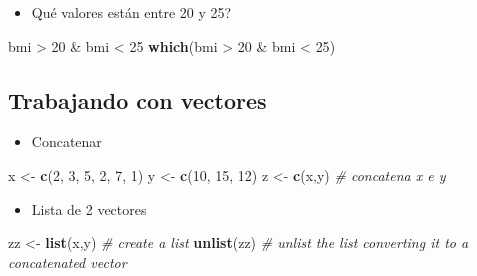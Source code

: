 \documentclass[]{article}
\def\tightlist{}
\newenvironment{Shaded}{\begin{snugshade}}{\end{snugshade}}
\newcommand{\KeywordTok}[1]{\textcolor[rgb]{0.13,0.29,0.53}{\textbf{{#1}}}}
\newcommand{\DecValTok}[1]{\textcolor[rgb]{0.00,0.00,0.81}{{#1}}}
\newcommand{\StringTok}[1]{\textcolor[rgb]{0.31,0.60,0.02}{{#1}}}
\newcommand{\CommentTok}[1]{\textcolor[rgb]{0.56,0.35,0.01}{\textit{{#1}}}}
\newcommand{\NormalTok}[1]{{#1}}
\numberwithin{equation}{section}
\begin{document}
\begin{itemize}
\tightlist
\item
  Qué valores están entre 20 y 25?
\end{itemize}

\begin{Shaded}
\begin{Highlighting}[]
\NormalTok{bmi >}\StringTok{ }\DecValTok{20} \NormalTok{&}\StringTok{ }\NormalTok{bmi <}\StringTok{ }\DecValTok{25}
\KeywordTok{which}\NormalTok{(bmi >}\StringTok{ }\DecValTok{20} \NormalTok{&}\StringTok{ }\NormalTok{bmi <}\StringTok{ }\DecValTok{25}\NormalTok{)}
\end{Highlighting}
\end{Shaded}

\subsection{Trabajando con vectores}\label{trabajando-con-vectores}

\begin{itemize}
\tightlist
\item
  Concatenar
\end{itemize}

\begin{Shaded}
\begin{Highlighting}[]
\NormalTok{x <-}\StringTok{ }\KeywordTok{c}\NormalTok{(}\DecValTok{2}\NormalTok{, }\DecValTok{3}\NormalTok{, }\DecValTok{5}\NormalTok{, }\DecValTok{2}\NormalTok{, }\DecValTok{7}\NormalTok{, }\DecValTok{1}\NormalTok{)}
\NormalTok{y <-}\StringTok{ }\KeywordTok{c}\NormalTok{(}\DecValTok{10}\NormalTok{, }\DecValTok{15}\NormalTok{, }\DecValTok{12}\NormalTok{)}
\NormalTok{z <-}\StringTok{ }\KeywordTok{c}\NormalTok{(x,y)  }\CommentTok{# concatena x e y}
\end{Highlighting}
\end{Shaded}

\begin{itemize}
\tightlist
\item
  Lista de 2 vectores
\end{itemize}

\begin{Shaded}
\begin{Highlighting}[]
\NormalTok{zz <-}\StringTok{ }\KeywordTok{list}\NormalTok{(x,y) }\CommentTok{# create a list}
\KeywordTok{unlist}\NormalTok{(zz) }\CommentTok{# unlist the list converting it to a concatenated vector}
\end{Highlighting}
\end{Shaded}
\end{document}

